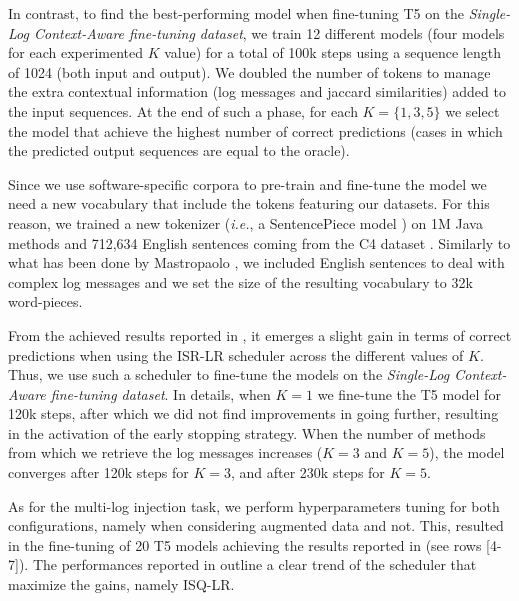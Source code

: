 In contrast, to find the best-performing model when fine-tuning T5 on the \textit{Single-Log Context-Aware fine-tuning dataset}, we train 12 different models (\ie four models for each experimented $K$ value) for a total of 100k steps using a sequence length of 1024 (both input and output). We doubled the number of tokens to manage the extra contextual information (\ie log messages and jaccard similarities) added to the input sequences. At the end of such a phase, for each $K=\{1,3,5\}$ we select the model that achieve the highest number of correct predictions (\ie cases in which the predicted output sequences are equal to the oracle).

Since we use software-specific corpora to pre-train and fine-tune the model we need a new vocabulary that include the \java tokens featuring our datasets. For this reason, we trained a new tokenizer (\emph{i.e.}, a SentencePiece model \cite{kudo2018sentencepiece}) on 1M Java methods and 712,634 English sentences coming from the C4 dataset \cite{raffel2019exploring}. Similarly to what has been done by Mastropaolo \etal \cite{mastropaolo2022using}, we included English sentences to deal with complex log messages and we set the size of the resulting vocabulary to 32k word-pieces.

From the achieved results reported in , it emerges a slight gain in terms of correct predictions when using the ISR-LR scheduler across the different values of $K$. Thus, we use such a scheduler to fine-tune the models on the	\textit{Single-Log Context-Aware fine-tuning dataset}. In details, when $K=1$ we fine-tune the T5 model for 120k steps, after which we did not find improvements in going further, resulting in the activation of the early stopping strategy. When the number of methods from which we retrieve the log messages increases (\ie $K=3$ and $K=5$), the model converges after 120k steps for $K=3$, and after 230k steps for $K=5$.

As for the multi-log injection task, we perform hyperparameters tuning for both configurations, namely when considering augmented data and not.
This, resulted in the fine-tuning of 20 T5 models achieving the results reported in  (see rows [4-7]). The performances reported in  outline a clear trend of the scheduler that maximize the gains, namely ISQ-LR.



